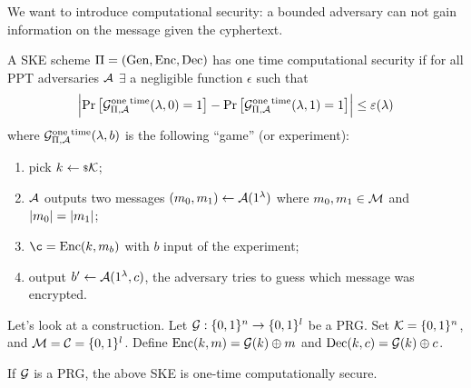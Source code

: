 We want to introduce computational security: a bounded adversary can not gain information on the message given the cyphertext.
\begin{definition}
	A \ac{SKE} scheme $\Pi = \left( \mathrm{Gen} , \allowbreak \mathrm{Enc} , \allowbreak \mathrm{Dec} \right)$ has one time computational security if for all \ac{PPT} adversaries $\mathcal{A}$ $\exists$ a negligible function $\epsilon$ such that
	\begin{equation*}
		\left|{
			\mathop{\mathrm{Pr}}\limits_{} \left[ {\mathcal{G}^{\scriptstyle \text{one time}}_{\Pi, \mathcal{A}}(\lambda, 0) = 1} \right]
			-
			\mathop{\mathrm{Pr}}\limits_{} \left[ {\mathcal{G}^{\scriptstyle \text{one time}}_{\Pi, \mathcal{A}}(\lambda, 1) = 1} \right]
		}\right|
		\le \varepsilon(\lambda)
	\end{equation*}
	where $\mathcal{G}^{\scriptstyle \text{one time}}_{\Pi, \mathcal{A}}(\lambda, b)$ is the following ``game'' (or experiment):
	\begin{enumerate}
		\item pick $k \leftarrow {\scriptstyle \$} {\mathcal{K}}$;
		\item $\mathcal{A}$ outputs two messages $(m_0, m_1) \leftarrow \mathcal{A}(1^{\lambda})$ where $m_0, m_1 \in \mathcal{M}$ and $\left|{m_0}\right| = \left|{m_1}\right|$;
		\item $\c = \SKEEnc(k, m_b)$ with $b$ input of the experiment;
		\item output $b' \leftarrow \mathcal{A}(1^{\lambda}, c)$, \ie the adversary tries to guess which message was encrypted. \qedhere
	\end{enumerate}
\end{definition}

Let's look at a construction.
Let $\mathcal{G} : \{0,1\}^{n} \to \{0,1\}^{l}$ be a \ac{PRG}.
Set $\mathcal{K} = \{0,1\}^{n}$, and $\mathcal{M} = \mathcal{C} = \{0,1\}^{l}$.
Define $\mathrm{Enc}(k,m) = \mathcal{G}(k) \oplus m$ and $\mathrm{Dec}(k,c) = \mathcal{G}(k) \oplus c$.

\begin{theorem} \label{thm:ske-prg}
	If $\mathcal{G}$ is a \ac{PRG}, the above \ac{SKE} is one-time computationally secure.
\end{theorem}

